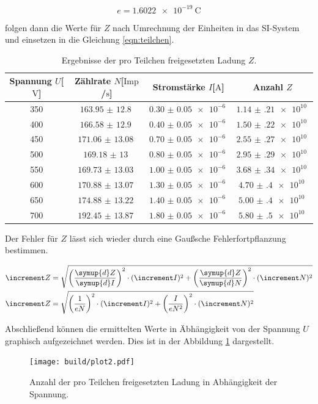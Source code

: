 \begin{equation*}
e = \SI{1.6022e-19}{\coulomb}
\end{equation*}
\begin{flushleft}
folgen dann die Werte für $Z$ nach Umrechnung der Einheiten in das SI-System und einsetzen in die Gleichung 
\eqref{eqn:teilchen}.
\end{flushleft}
\begin{table}
\centering
\caption{Ergebnisse der pro Teilchen freigesetzten Ladung $Z$.}
\label{tab:result}
\begin{tabular}{c c c c}
    \toprule
    Spannung $U$[$\si{\volt}$] & Zählrate $N$[$\text{Imp}$/$\si{\second}$] & Stromstärke $I$[$\si{\ampere}$] & Anzahl $Z$ \\
    \midrule
    350  & $\SI{163.95(1280)}{}$ & $\SI{0.30(5)e-6}{}$  & $\SI{1.14(21)e10}{}$\\
    400	 & $\SI{166.58(1290)}{}$ & $\SI{0.40(5)e-6}{}$  & $\SI{1.50(22)e10}{}$\\
    450	 & $\SI{171.06(1308)}{}$ & $\SI{0.70(5)e-6}{}$  & $\SI{2.55(27)e10}{}$\\
    500	 & $\SI{169.18(1300)}{}$ & $\SI{0.80(5)e-6}{}$  & $\SI{2.95(29)e10}{}$\\
    550	 & $\SI{169.73(1303)}{}$ & $\SI{1.00(5)e-6}{}$  & $\SI{3.68(34)e10}{}$\\
    600	 & $\SI{170.88(1307)}{}$ & $\SI{1.30(5)e-6}{}$  & $\SI{4.70(40)e10}{}$\\
    650	 & $\SI{174.88(1322)}{}$ & $\SI{1.40(5)e-6}{}$  & $\SI{5.00(40)e10}{}$\\
    700	 & $\SI{192.45(1387)}{}$ & $\SI{1.80(5)e-6}{}$  & $\SI{5.80(50)e10}{}$\\
    \bottomrule
\end{tabular}
\end{table}

Der Fehler für $Z$ lässt sich wieder durch eine Gaußsche Fehlerfortpflanzung bestimmen.

\begin{align*}
\increment Z &= \sqrt{\left( \frac{\symup{d}Z}{\symup{d}I} \right)^{2} \cdot (\increment I)^{2} 
+ \left( \frac{\symup{d}Z}{\symup{d}N} \right)^{2} \cdot (\increment N)^{2}
}\\
\increment Z &=\sqrt{\left( \frac{1}{e N} \right)^{2} \cdot (\increment I)^{2} 
+ \left( \frac{I}{e N^{2}} \right)^{2} \cdot (\increment N)^{2}
}
\end{align*}
\begin{flushleft}
Abschließend können die ermittelten Werte in Äbhängigkeit von der Spannung $U$ graphisch aufgezeichnet werden.
Dies ist in der Abbildung \ref{fig:plot2} dargestellt.
\end{flushleft}
\begin{figure}[h]
  \centering
  \texttt{[image: build/plot2.pdf]}
  \caption{Anzahl der pro Teilchen freigesetzten Ladung in Abhängigkeit der Spannung.}
  \label{fig:plot2}
\end{figure}